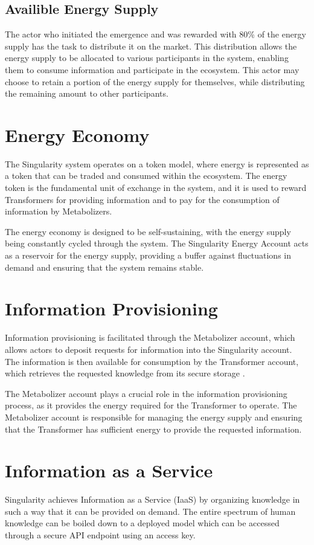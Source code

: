 \documentclass{article}
\begin{document}
\subsection{Availible Energy Supply}
The actor who initiated the emergence and was rewarded with 80\% of the energy supply has the task to distribute it on the market. This distribution allows the energy supply to be allocated to various participants in the system, enabling them to consume information and participate in the ecosystem. This actor may choose to retain a portion of the energy supply for themselves, while distributing the remaining amount to other participants.

\section{Energy Economy}
The Singularity system operates on a token model, where energy is represented as a token that can be traded and consumed within the ecosystem. The energy token is the fundamental unit of exchange in the system, and it is used to reward Transformers for providing information and to pay for the consumption of information by Metabolizers.

The energy economy is designed to be self-sustaining, with the energy supply being constantly cycled through the system. The Singularity Energy Account acts as a reservoir for the energy supply, providing a buffer against fluctuations in demand and ensuring that the system remains stable.

\section{Information Provisioning}
Information provisioning is facilitated through the Metabolizer account, which allows actors to deposit requests for information into the Singularity account. The information is then available for consumption by the Transformer account, which retrieves the requested knowledge from its secure storage \cite{stallings2017cryptography}.

The Metabolizer account plays a crucial role in the information provisioning process, as it provides the energy required for the Transformer to operate. The Metabolizer account is responsible for managing the energy supply and ensuring that the Transformer has sufficient energy to provide the requested information.

\newpage

\section{Information as a Service}
Singularity achieves Information as a Service (IaaS) by organizing knowledge in such a way that it can be provided on demand. The entire spectrum of human knowledge can be boiled down to a deployed model which can be accessed through a secure API endpoint using an access key. 
\end{document}
